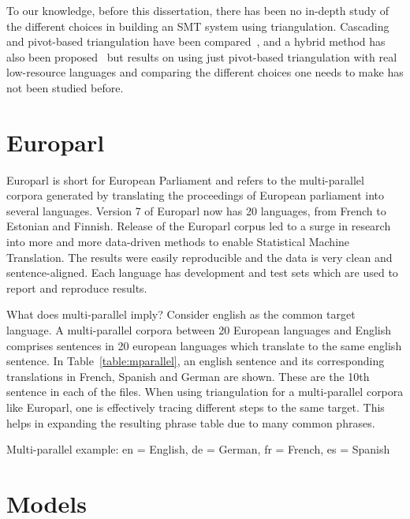  To our knowledge, before this dissertation, there has been no in-depth study of the different choices in building an SMT system using triangulation. Cascading and pivot-based triangulation have been compared~\cite{Utiyama:07,Gispert:06}, and a hybrid method has also been proposed~\cite{Wu:09} but results on using just pivot-based triangulation with real low-resource languages and comparing the different choices one needs to make has not been studied before. 

 \section{Europarl}
 \label{sec:europarl}
Europarl is short for European Parliament and refers to the multi-parallel corpora generated by translating the proceedings of European parliament into several languages. Version 7 of Europarl now has 20 languages, from French to Estonian and Finnish. Release of the Europarl corpus led to a surge in research into more and more data-driven methods to enable Statistical Machine Translation. The results were easily reproducible and the data is very clean and sentence-aligned. Each language has development and test sets which are used to report and reproduce results. 

What does multi-parallel imply? Consider english as the common target language. A multi-parallel corpora between 20 European languages and English comprises sentences in 20 european languages which translate to the same english sentence. In Table~\ref{table:mparallel}, an english sentence and its corresponding translations in French, Spanish and German are shown. These are the 10th sentence in each of the files. When using triangulation for a multi-parallel corpora like Europarl, one is effectively tracing different steps to the same target. This helps in expanding the resulting phrase table due to many common phrases. 

\begin{table*}
	\small
	\centering
	\small
	
	\caption{Multi-parallel example: en = English, de = German, fr = French, es = Spanish}
	\label{table:mparallel}
\end{table*}


\section{Models}
\label{sec:models}

